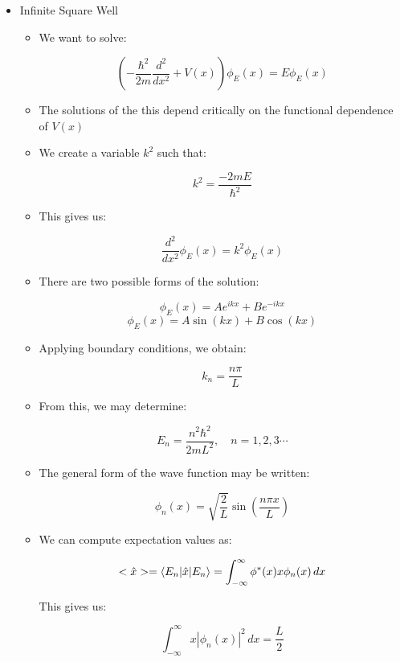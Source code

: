 \begin{itemize}
\begin{itemize}
    \end{itemize}

  \item Infinite Square Well

    \begin{itemize}

      \item We want to solve:

        $$\left( -\frac{\hbar^2}{2m}\frac{d^2}{dx^2}+V(x) \right)\phi_E(x)=E\phi_E(x)$$

      \item The solutions of the this depend critically on the functional dependence of $V(x)$

      \item We create a variable $k^2$ such that:

        $$k^2=\frac{-2mE}{\hbar^2}$$

      \item This gives us:

        $$\frac{d^2}{dx^2}\phi_E(x)=k^2\phi_E(x)$$

      \item There are two possible forms of the solution:

        $$\phi_E(x)=Ae^{ikx}+Be^{-ikx}$$
        $$\phi_E(x)=A\sin(kx)+B\cos(kx)$$

      \item Applying boundary conditions, we obtain:

        $$k_n=\frac{n\pi}{L}$$

      \item From this, we may determine:

        $$E_n=\frac{n^2\hbar^2}{2mL^2},\quad n=1,2,3\cdots$$

      \item The general form of the wave function may be written:

        $$\phi_n(x)=\sqrt{\frac{2}{L}}\sin\left( \frac{n\pi x}{L} \right)$$

      \item We can compute expectation values as:

        $$<\hat{x}>=\bra{E_n|\hat{x}}\ket{E_n}=\int_{-\infty}^{\infty}\phi^{*}(x)x\phi_n(x)\,dx$$

        This gives us:

        $$\int_{-\infty}^{\infty}x|\phi_n(x)|^2\,dx=\frac{L}{2}$$

    \end{itemize}


\end{itemize}
